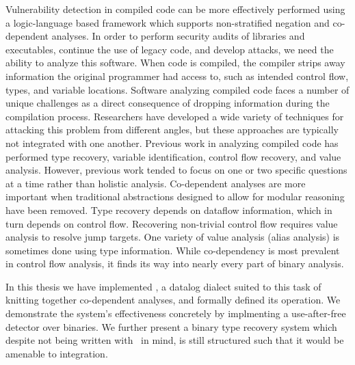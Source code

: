 Vulnerability detection in compiled code can be more effectively performed using a logic-language based framework which supports non-stratified negation and co-dependent analyses.
In order to perform security audits of libraries and executables, continue the use of legacy code, and develop attacks, we need the ability to analyze this software.
When code is compiled, the compiler strips away information the original programmer had access to, such as intended control flow, types, and variable locations.
Software analyzing compiled code faces a number of unique challenges as a direct consequence of dropping information during the compilation process.
Researchers have developed a wide variety of techniques for attacking this problem from different angles, but these approaches are typically not integrated with one another.
Previous work in analyzing compiled code has performed type recovery, variable identification, control flow recovery, and value analysis.
However, previous work tended to focus on one or two specific questions at a time rather than holistic analysis.
Co-dependent analyses are more important when traditional abstractions designed to allow for modular reasoning have been removed.
Type recovery depends on dataflow information, which in turn depends on control flow.
Recovering non-trivial control flow requires value analysis to resolve jump targets.
One variety of value analysis (alias analysis) is sometimes done using type information.
While co-dependency is most prevalent in control flow analysis, it finds its way into nearly every part of binary analysis.

In this thesis we have implemented \sysname, a datalog dialect suited to this task of knitting together co-dependent analyses, and formally defined its operation.
We demonstrate the system's effectiveness concretely by implmenting a use-after-free detector over binaries.
We further present a binary type recovery system which despite not being written with \sysname\ in mind, is still structured such that it would be amenable to integration.
